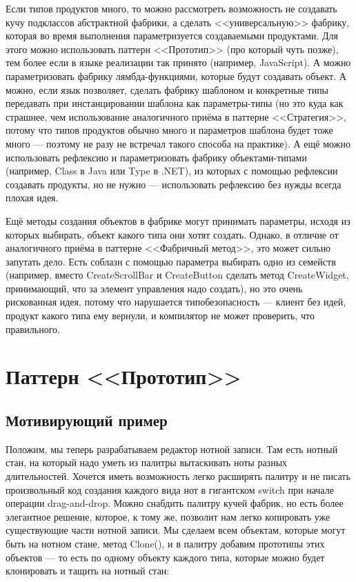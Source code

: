 \documentclass{../../text-style}
\begin{document}
Если типов продуктов много, то можно рассмотреть возможность не создавать кучу подклассов абстрактной фабрики, а сделать <<универсальную>> фабрику, которая во время выполнения параметризуется создаваемыми продуктами. Для этого можно использовать паттерн <<Прототип>> (про который чуть позже), тем более если в языке реализации так принято (например, JavaScript). А можно параметризовать фабрику лямбда-функциями, которые будут создавать объект. А можно, если язык позволяет, сделать фабрику шаблоном и конкретные типы передавать при инстанцировании шаблона как параметры-типы (но это куда как страшнее, чем использование аналогичного приёма в паттерне <<Стратегия>>, потому что типов продуктов обычно много и параметров шаблона будет тоже много --- поэтому не разу не встречал такого способа на практике). А ещё можно использовать рефлексию и параметризовать фабрику объектами-типами (например, Class в Java или Type в .NET), из которых с помощью рефлексии создавать продукты, но не нужно --- использовать рефлексию без нужды всегда плохая идея.

Ещё методы создания объектов в фабрике могут принимать параметры, исходя из которых выбирать, объект какого типа они хотят создать. Однако, в отличие от аналогичного приёма в паттерне <<Фабричный метод>>, это может сильно запутать дело. Есть соблазн с помощью параметра выбирать одно из семейств (например, вместо CreateScrollBar и CreateButton сделать метод CreateWidget, принимающий, что за элемент управления надо создать), но это очень рискованная идея, потому что нарушается типобезопасность --- клиент без идей, продукт какого типа ему вернули, и компилятор не может проверить, что правильного.

\section{Паттерн <<Прототип>>}

\subsection{Мотивирующий пример}

Положим, мы теперь разрабатываем редактор нотной записи. Там есть нотный стан, на который надо уметь из палитры вытаскивать ноты разных длительностей. Хочется иметь возможность легко расширять палитру и не писать произвольный код создания каждого вида нот в гигантском switch при начале операции drag-and-drop. Можно снабдить палитру кучей фабрик, но есть более элегантное решение, которое, к тому же, позволит нам легко копировать уже существующие части нотной записи. Мы сделаем всем объектам, которые могут быть на нотном стане, метод Clone(), и в палитру добавим прототипы этих объектов --- то есть по одному объекту каждого типа, которые можно будет клонировать и тащить на нотный стан:
\end{document}

